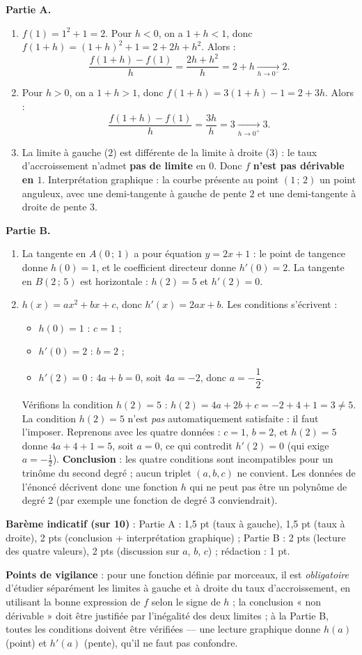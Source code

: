 \documentclass[11pt]{article}
\newcommand{\cle}[1]{{\popxbold\color{popdark}#1}}
\begin{document}
\begin{corrige}
\textbf{Partie A.}
\begin{enumerate}
\item $f(1)=1^2+1=2$. Pour $h<0$, on a $1+h<1$, donc $f(1+h)=(1+h)^2+1=2+2h+h^2$. Alors :
\[ \frac{f(1+h)-f(1)}{h}=\frac{2h+h^2}{h}=2+h \xrightarrow[h\to 0^-]{} 2. \]
\item Pour $h>0$, on a $1+h>1$, donc $f(1+h)=3(1+h)-1=2+3h$. Alors :
\[ \frac{f(1+h)-f(1)}{h}=\frac{3h}{h}=3 \xrightarrow[h\to 0^+]{} 3. \]
\item La limite à gauche ($2$) est différente de la limite à droite ($3$) : le taux d'accroissement n'admet \textbf{pas de limite} en $0$. Donc $f$ \textbf{n'est pas dérivable en $1$}. Interprétation graphique : la courbe présente au point $(1\,;\,2)$ un \cle{point anguleux}, avec une demi-tangente à gauche de pente $2$ et une demi-tangente à droite de pente $3$.
\end{enumerate}
\textbf{Partie B.}
\begin{enumerate}
\item La tangente en $A(0\,;\,1)$ a pour équation $y=2x+1$ : le point de tangence donne $h(0)=1$, et le coefficient directeur donne $h'(0)=2$. La tangente en $B(2\,;\,5)$ est horizontale : $h(2)=5$ et $h'(2)=0$.
\item $h(x)=ax^2+bx+c$, donc $h'(x)=2ax+b$. Les conditions s'écrivent :
\begin{itemize}
\item $h(0)=1$ : $c=1$ ;
\item $h'(0)=2$ : $b=2$ ;
\item $h'(2)=0$ : $4a+b=0$, soit $4a=-2$, donc $a=-\dfrac{1}{2}$.
\end{itemize}
Vérifions la condition $h(2)=5$ : $h(2)=4a+2b+c=-2+4+1=3\neq 5$. La condition $h(2)=5$ n'est \emph{pas} automatiquement satisfaite : il faut l'imposer. Reprenons avec les quatre données : $c=1$, $b=2$, et $h(2)=5$ donne $4a+4+1=5$, soit $a=0$, ce qui contredit $h'(2)=0$ (qui exige $a=-\tfrac12$). \textbf{Conclusion} : les quatre conditions sont incompatibles pour un trinôme du second degré ; aucun triplet $(a,b,c)$ ne convient. Les données de l'énoncé décrivent donc une fonction $h$ qui ne peut pas être un polynôme de degré $2$ (par exemple une fonction de degré $3$ conviendrait).
\end{enumerate}
\textbf{Barème indicatif (sur 10)} : Partie A : 1,5 pt (taux à gauche), 1,5 pt (taux à droite), 2 pts (conclusion + interprétation graphique) ; Partie B : 2 pts (lecture des quatre valeurs), 2 pts (discussion sur $a$, $b$, $c$) ; rédaction : 1 pt.

\textbf{Points de vigilance} : pour une fonction définie par morceaux, il est \emph{obligatoire} d'étudier séparément les limites à gauche et à droite du taux d'accroissement, en utilisant la bonne expression de $f$ selon le signe de $h$ ; la conclusion « non dérivable » doit être justifiée par l'inégalité des deux limites ; à la Partie B, toutes les conditions doivent être vérifiées — une lecture graphique donne $h(a)$ (point) et $h'(a)$ (pente), qu'il ne faut pas confondre.
\end{corrige}
\end{document}
